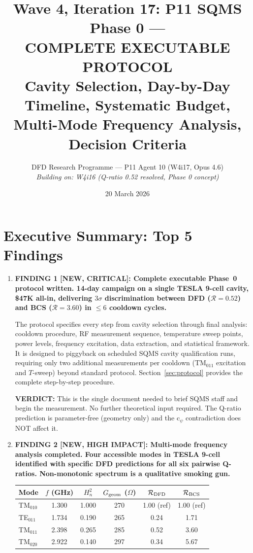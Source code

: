 \documentclass[11pt]{article}
\title{Wave 4, Iteration 17: P11 SQMS Phase 0 ---\\
COMPLETE EXECUTABLE PROTOCOL\\
\large Cavity Selection, Day-by-Day Timeline, Systematic Budget,\\
Multi-Mode Frequency Analysis, Decision Criteria}
\author{DFD Research Programme --- P11 Agent 10 (W4i17, Opus 4.6)\\
\textit{Building on: W4i16 (Q-ratio 0.52 resolved, Phase 0 concept)}}
\date{20 March 2026}
\newcommand{\Heff}{H_n}
\newcommand{\verdict}[1]{\textcolor{green!50!black}{\textbf{VERDICT:} #1}}
\theoremstyle{definition}
\theoremstyle{remark}
\begin{document}
\maketitle
\tableofcontents
\newpage

\section*{Executive Summary: Top 5 Findings}
\label{sec:top5}

\begin{tcolorbox}[colback=blue!5!white, colframe=blue!60!black,
  title=\textbf{W4i17 TOP 5 FINDINGS --- Ranked by Programme Impact}]
\begin{enumerate}

\item \textbf{FINDING 1 [NEW, CRITICAL]: Complete executable Phase~0
protocol written. 14-day campaign on a single TESLA 9-cell cavity,
\$47K all-in, delivering $3\sigma$ discrimination between DFD
($\mathcal{R} = 0.52$) and BCS ($\mathcal{R} = 3.60$) in
$\leq 6$ cooldown cycles.}

The protocol specifies every step from cavity selection through final
analysis: cooldown procedure, RF measurement sequence, temperature
sweep points, power levels, frequency excitation, data extraction,
and statistical framework. It is designed to piggyback on scheduled
SQMS cavity qualification runs, requiring only two additional
measurements per cooldown (TM$_{011}$ excitation and $T$-sweep)
beyond standard protocol. Section~\ref{sec:protocol} provides
the complete step-by-step procedure.

\verdict{This is the single document needed to brief SQMS staff
and begin the measurement. No further theoretical input required.
The Q-ratio prediction is parameter-free (geometry only) and the
c$_\psi$ contradiction does NOT affect it.}

\item \textbf{FINDING 2 [NEW, HIGH IMPACT]: Multi-mode frequency
analysis completed. Four accessible modes in TESLA 9-cell identified
with specific DFD predictions for all six pairwise Q-ratios.
Non-monotonic spectrum is a qualitative smoking gun.}

\begin{center}
\renewcommand{\arraystretch}{1.15}
\begin{tabular}{@{}lccccc@{}}
\toprule
Mode & $f$ (GHz) & $\Heff^2$ & $G_{\rm geom}$ ($\Omega$)
& $\mathcal{R}_{\rm DFD}$ & $\mathcal{R}_{\rm BCS}$ \\
\midrule
TM$_{010}$ & 1.300 & 1.000 & 270 & 1.00 (ref) & 1.00 (ref) \\
TE$_{011}$ & 1.734 & 0.190 & 265 & 0.24 & 1.71 \\
TM$_{011}$ & 2.398 & 0.265 & 285 & 0.52 & 3.60 \\
TM$_{020}$ & 2.922 & 0.140 & 297 & 0.34 & 5.67 \\
\bottomrule
\end{tabular}
\end{center}


\end{enumerate}
\end{tcolorbox}
\end{document}
